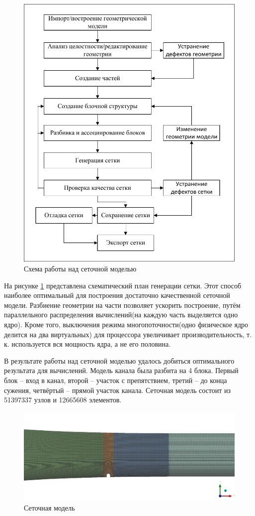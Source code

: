 	\begin{figure}[H]
		\centering
		\includegraphics[width=0.7\linewidth]{../Assets/СхемаСозданияСеткиRU}
		\caption{Схема работы над сеточной моделью}
		\label{fig:meshScheme}
	\end{figure}
	
	На рисунке \ref{fig:meshScheme} представлена схематический план генерации сетки. Этот способ наиболее оптимальный для построения достаточно качественной сеточной модели. Разбиение геометрии на части позволяет ускорить построение, путём параллельного распределения вычислений(на каждую часть выделяется одно ядро). Кроме того, выключения режима многопоточности(одно физическое ядро делится на два виртуальных) для процессора увеличивает производительность, т. к. используется вся мощность ядра, а не его половина.
	
	В результате работы над сеточной моделью удалось добиться оптимального результата для вычислений. Модель канала была разбита на 4 блока. Первый блок -- вход в канал, второй -- участок с препятствием, третий -- до конца сужения, четвёртый -- прямой участок канала. Сеточная модель состоит из 51397337 узлов и 12665608 элементов.
	\begin{figure}[H]
		\centering
		\includegraphics[width=1\linewidth]{../Assets/Mesh1}
		\caption{Сеточная модель}
		\label{fig:mesh1}
	\end{figure}
	
